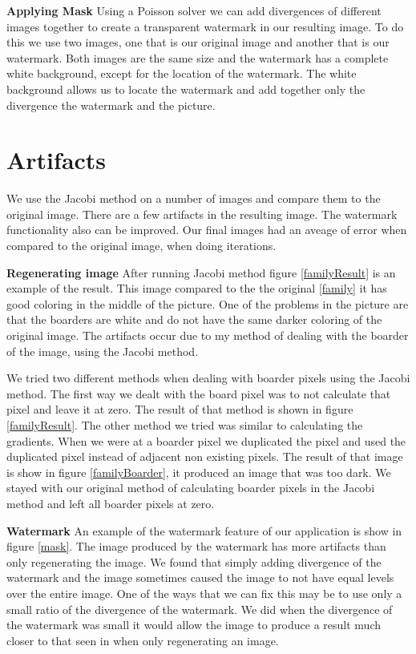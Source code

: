 \documentclass[10pt,twopage]{acmsiggraph}
\begin{document}
{\bf Applying Mask} Using a Poisson solver we can add divergences of different images together to create a transparent watermark in our resulting image. To do this we use two images, one that is our original image and another that is our watermark. Both images are the same size and the watermark has a complete white background, except for the location of the watermark. The white background allows us to locate the watermark and add together only the divergence the watermark and the picture.

\section{Artifacts}

We use the Jacobi method on a number of images and compare them to the original image. There are a few artifacts in the resulting image. The watermark functionality also can be improved. Our final images had an aveage of \result error when compared to the original image, when doing \iteration iterations.

{\bf Regenerating image} After running Jacobi method figure \ref{familyResult} is an example of the result. This image compared to the the original \ref{family} it has good coloring in the middle of the picture. One of the problems in the picture are that the boarders are white and do not have the same darker coloring of the original image. The artifacts occur due to my method of dealing with the boarder of the image, using the Jacobi method.

We tried two different methods when dealing with boarder pixels using the Jacobi method. The first way we dealt with the board pixel was to not calculate that pixel and leave it at zero. The result of that method is shown in figure \ref{familyResult}. The other method we tried was similar to calculating the gradients. When we were at a boarder pixel we duplicated the pixel and used the duplicated pixel instead of adjacent non existing pixels. The result of that image is show in figure \ref{familyBoarder}, it produced an image that was too dark. We stayed with our original method of calculating boarder pixels in the Jacobi method and left all boarder pixels at zero. 

{\bf Watermark} An example of the watermark feature of our application is show in figure \ref{mask}. The image produced by the watermark has more artifacts than only regenerating the image. We found that simply adding divergence of the watermark and the image sometimes caused the image to not have equal levels over the entire image. One of the ways that we can fix this may be to use only a small ratio of the divergence of the watermark. We did when the divergence of the watermark was small it would allow the image to produce a result much closer to that seen in when only regenerating an image.
\end{document}
